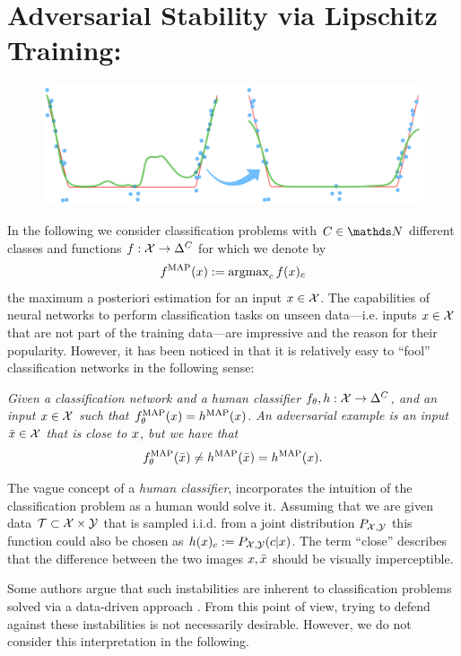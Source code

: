 \section{Adversarial Stability via Lipschitz Training: \cite{bungert2021clip}}\label{sec:CLIP}
%
\begin{figure}
	\centering
	\includegraphics[width=.5\textwidth]{atelier/CLIP/CLIP.png}
\end{figure}
%
%
In the following we consider classification problems with $C\in\N$ different classes and functions $f:\mathcal{X}\to\Delta^C$ for which we denote by 
\begin{align*}
f^{\operatorname{MAP}}(x):=\operatorname{argmax}_c f(x)_c
\end{align*}%
%
the maximum a posteriori estimation for an input $x\in\mathcal{X}$. The capabilities of neural networks to perform classification tasks on unseen data---i.e. inputs $x\in\mathcal{X}$ that are not part of the training data---are impressive and the reason for their popularity. However, it has been noticed in \cite{goodfellow2014explaining} that it is relatively easy to \enquote{fool} classification networks in the following sense:
%
\begin{center}
\textit{
Given a classification network and a human classifier $f_\theta, h:\mathcal{X}\to\Delta^C$, and an input $x\in\mathcal{X}$ such that $f_\theta^{\operatorname{MAP}}(x) = h^{\operatorname{MAP}}(x)$. An adversarial example is an input $\bar{x}\in \mathcal{X}$ that is close to $x$, but we have that
%
\begin{align*}
f_\theta^{\operatorname{MAP}}(\bar{x})\neq h^{\operatorname{MAP}}(\bar{x}) = h^{\operatorname{MAP}}(x).
\end{align*}
}
\end{center}
%
%
The vague concept of a \emph{human classifier}, incorporates the intuition of the classification problem as a human would solve it. Assuming that we are given data $\mathcal{T}\subset \mathcal{X}\times\mathcal{\mathcal{Y}}$ that is sampled i.i.d. from a joint distribution $P_{\mathcal{X},\mathcal{\mathcal{Y}}}$ this function could also be chosen as $h(x)_c:=P_{\mathcal{X},\mathcal{\mathcal{Y}}}(c|x)$. The term \enquote{close} describes that the difference between the two images $x,\bar{x}$ should be visually imperceptible.


\begin{remark}{}{}
Some authors argue that such instabilities are inherent to classification problems solved via a data-driven approach \cite{shafahi2018adversarial, fawzi2018adversarial}. From this point of view, trying to defend against these instabilities is not necessarily desirable. However, we do not consider this interpretation in the following.
\end{remark}
%
%
%
